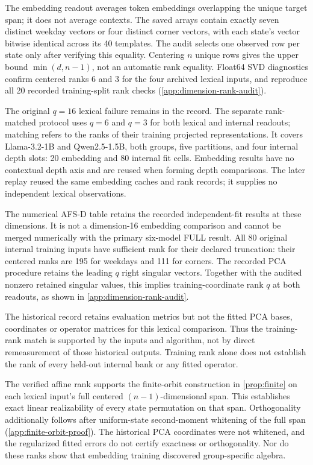 The embedding readout averages token embeddings overlapping
the unique target span; it does not average contexts.
The saved arrays contain exactly seven distinct weekday
vectors or four distinct corner vectors, with each state's
vector bitwise identical across its 40 templates.
The audit selects one observed row per state only after
verifying this equality.
Centering $n$ unique rows gives the upper bound
$\min(d,n-1)$, not an automatic rank equality.
Float64 SVD diagnostics confirm centered ranks 6 and 3
for the four archived lexical inputs, and reproduce all
20 recorded training-split rank checks
(\cref{app:dimension-rank-audit}).

The original $q=16$ lexical failure remains in the record.
The separate rank-matched protocol uses $q=6$ and $q=3$
for both lexical and internal readouts;
matching refers to the ranks of their training projected
representations.
It covers Llama-3.2-1B and Qwen2.5-1.5B, both groups,
five partitions, and four internal depth slots:
20 embedding and 80 internal fit cells.
Embedding results have no contextual depth axis and are
reused when forming depth comparisons.
The later replay reused the same embedding caches and rank
records; it supplies no independent lexical observations.

The numerical AFS-D table retains the recorded independent-fit
results at these dimensions.
It is not a dimension-16 embedding comparison and cannot be
merged numerically with the primary six-model FULL result.
All 80 original internal training inputs have sufficient rank
for their declared truncation:
their centered ranks are 195 for weekdays and 111 for corners.
The recorded PCA procedure retains the leading $q$ right
singular vectors.
Together with the audited nonzero retained singular values,
this implies training-coordinate rank $q$ at both readouts,
as shown in \cref{app:dimension-rank-audit}.

The historical record retains evaluation metrics but not
the fitted PCA bases, coordinates or operator matrices
for this lexical comparison.
Thus the training-rank match is supported by the inputs and
algorithm, not by direct remeasurement of those historical
outputs.
Training rank alone does not establish the rank of every
held-out internal bank or any fitted operator.

The verified affine rank supports the finite-orbit construction
in \cref{prop:finite} on each lexical input's full centered
$(n-1)$-dimensional span.
This establishes exact linear realizability of every state
permutation on that span.
Orthogonality additionally follows after uniform-state
second-moment whitening of the full span
(\cref{app:finite-orbit-proof}).
The historical PCA coordinates were not whitened,
and the regularized fitted errors do not certify exactness
or orthogonality.
Nor do these ranks show that embedding training discovered
group-specific algebra.

